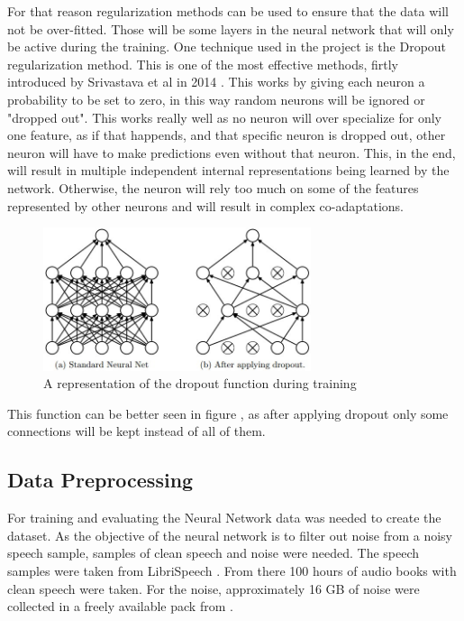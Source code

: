 For that reason regularization methods can be used to ensure that the data will not be over-fitted. Those will be some layers in the neural network that will only be active during the training.
One technique used in the project is the Dropout regularization method. This is one of the most effective methods, firtly introduced by Srivastava et al in 2014 . This works by giving each neuron a probability to be set to zero, in this way random neurons will be ignored or "dropped out". This works really well as no neuron will over specialize for only one feature, as if that happends, and that specific neuron is dropped out, other neuron will have to make predictions even without that neuron. This, in the end, will result in multiple independent internal representations being learned by the network. Otherwise, the neuron will rely too much on some of the features represented by other neurons and will result in complex co-adaptations.


\begin{figure}[htp]
	\centering
	\includegraphics[width=0.7\textwidth]{Illustrations/dropout.jpeg}
	\caption{A representation of the dropout function during training}
	\label{fig:dropout}
\end{figure}

This function can be better seen in figure , as after applying dropout only some connections will be kept instead of all of them.
\newpage
\subsection{Data Preprocessing}

For training and evaluating the Neural Network data was needed to create the dataset. As the objective of the neural network is to filter out noise from a noisy speech sample, samples of clean speech and noise were needed. The speech samples were taken from LibriSpeech . From there 100 hours of audio books with clean speech were taken.
For the noise, approximately 16 GB of noise were collected in a freely available pack from .


